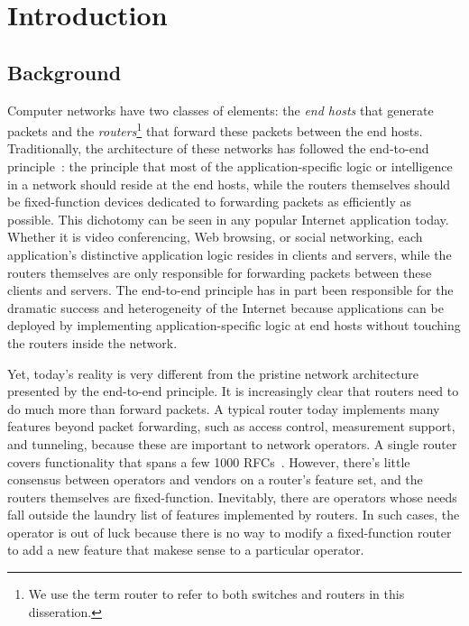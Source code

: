 \chapter{Introduction}
\label{chap:intro}

\section{Background}
Computer networks have two classes of elements: the \textit{end hosts} that
generate packets and the \textit{routers}\footnote{We use the term router to
refer to both switches and routers in this disseration.} that forward these
packets between the end hosts. Traditionally, the architecture of these
networks has followed the end-to-end principle~\cite{e2e}: the principle that
most of the application-specific logic or intelligence in a network should
reside at the end hosts, while the routers themselves should be fixed-function
devices dedicated to forwarding packets as efficiently as possible. This
dichotomy can be seen in any popular Internet application today. Whether it is
video conferencing, Web browsing, or social networking, each application's
distinctive application logic resides in clients and servers, while the routers
themselves are only responsible for forwarding packets between these clients
and servers. The end-to-end principle has in part been responsible for the
dramatic success and heterogeneity of the Internet because applications can be
deployed by implementing application-specific logic at end hosts without
touching the routers inside the network.

Yet, today's reality is very different from the pristine network architecture
presented by the end-to-end principle. It is increasingly clear that routers
need to do much more than forward packets. A typical router today implements
many features beyond packet forwarding, such as access control, measurement
support, and tunneling, because these are important to network operators. A
single router covers functionality that spans a few 1000
RFCs~\cite{lavanya_compiler}. However, there's little consensus between
operators and vendors on a router's feature set, and the routers themselves are
fixed-function. Inevitably, there are operators whose needs fall outside the
laundry list of features implemented by routers. In such cases, the operator is
out of luck because there is no way to modify a fixed-function router to add a
new feature that makese sense to a particular operator.

